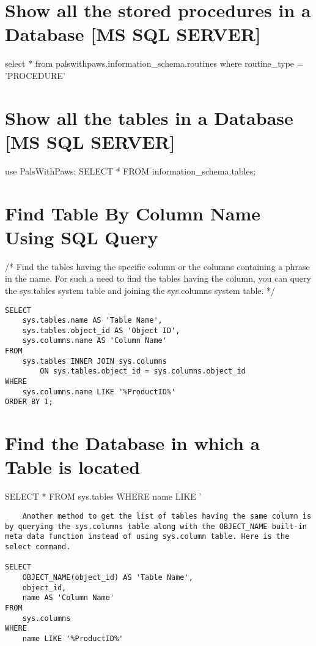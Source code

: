 \newpage

\section {Show all the stored procedures in a Database [MS SQL SERVER]}

select * 
from palswithpaws.information_schema.routines 
where routine_type = 'PROCEDURE'

\section {Show all the tables in a Database [MS SQL SERVER]}

use PalsWithPaws; 
SELECT  * 
FROM    information_schema.tables;

\section {Find Table By Column Name Using SQL Query}
/* Find the tables having the specific column or the columns containing a phrase in the name. For such a need to find the tables having the column, you can query the sys.tables system table and joining the sys.columns system table. */

\begin{verbatim}
SELECT
    sys.tables.name AS 'Table Name', 
    sys.tables.object_id AS 'Object ID', 
    sys.columns.name AS 'Column Name'
FROM
    sys.tables INNER JOIN sys.columns 
        ON sys.tables.object_id = sys.columns.object_id
WHERE
    sys.columns.name LIKE '%ProductID%'
ORDER BY 1;
\end{verbatim}

\section {Find the Database in which a Table is located}
SELECT * 
FROM  sys.tables 
WHERE     name LIKE     '%

\begin{verbatim}
    Another method to get the list of tables having the same column is by querying the sys.columns table along with the OBJECT_NAME built-in meta data function instead of using sys.column table. Here is the select command.

SELECT
    OBJECT_NAME(object_id) AS 'Table Name', 
    object_id, 
    name AS 'Column Name'
FROM
    sys.columns 
WHERE
    name LIKE '%ProductID%'

\end{verbatim}